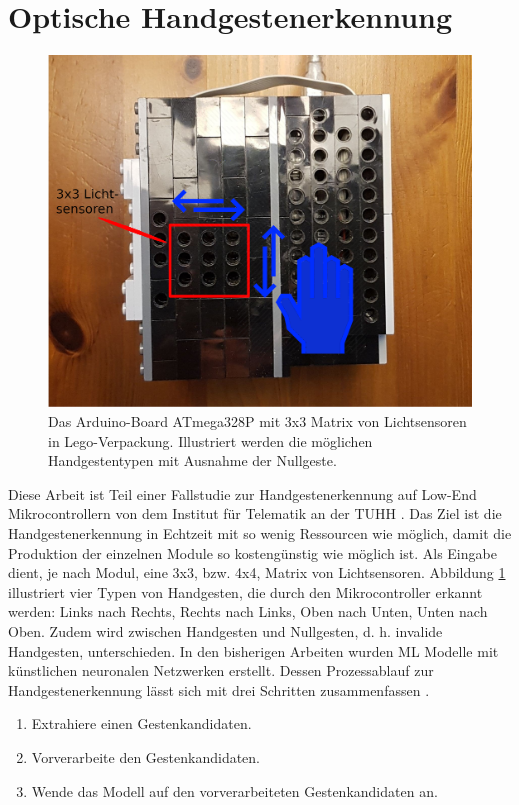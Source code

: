 \section{Optische Handgestenerkennung}
\label{sec:fallstudie}
\begin{figure}
    \centering
    \includegraphics[width=0.6\linewidth]{images/arduino_ex.png}
    \caption{Das Arduino-Board ATmega328P mit 3x3 Matrix von Lichtsensoren in Lego-Verpackung. Illustriert werden die möglichen Handgestentypen mit Ausnahme der Nullgeste.}
    \label{fig:arduino_ex}
\end{figure}
Diese Arbeit ist Teil einer Fallstudie zur Handgestenerkennung auf Low-End Mikrocontrollern von dem Institut für Telematik an der TUHH \cite{venzkeArticle}. Das Ziel ist die Handgestenerkennung in Echtzeit mit so wenig
Ressourcen wie möglich, damit die Produktion der einzelnen Module so kostengünstig wie möglich ist. Als Eingabe dient, je nach Modul, eine 3x3, bzw. 4x4, Matrix von Lichtsensoren. Abbildung \ref{fig:arduino_ex}
illustriert vier Typen von Handgesten, die durch den Mikrocontroller erkannt werden: Links nach Rechts, Rechts nach Links, Oben nach Unten, Unten nach Oben. Zudem wird zwischen Handgesten und Nullgesten, d. h.
invalide Handgesten, unterschieden. In den bisherigen Arbeiten wurden ML Modelle mit künstlichen neuronalen Netzwerken erstellt. Dessen Prozessablauf zur Handgestenerkennung lässt sich mit drei
Schritten zusammenfassen \cite{venzkeArticle}.
\begin{enumerate}
    \item Extrahiere einen Gestenkandidaten.
    \item Vorverarbeite den Gestenkandidaten.
    \item Wende das Modell auf den vorverarbeiteten Gestenkandidaten an.
\end{enumerate}





